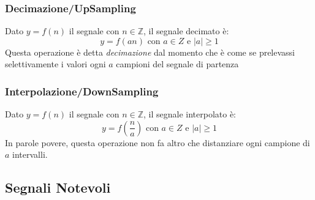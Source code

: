 \subsubsection{Decimazione/UpSampling}
Dato $y=f(n)$ il segnale con $n \in \mathbb{Z}$, il segnale decimato è:
\begin{equation}
    y = f(an) \mbox{ con } a \in Z \mbox{ e } |a| \geq 1 
\end{equation}
Questa operazione è detta \textit{decimazione} dal momento che è come se prelevassi selettivamente i valori ogni $a$ campioni del segnale di partenza

\subsubsection{Interpolazione/DownSampling}
Dato $y=f(n)$ il segnale con $n \in \mathbb{Z}$, il segnale interpolato è:
\begin{equation}
    y = f\left(\frac{n}{a}\right) \mbox{ con } a \in Z \mbox{ e } |a| \geq 1 
\end{equation}
In parole povere, questa operazione non fa altro che distanziare ogni campione di $a$ intervalli.

\newpage

\subsection{Segnali Notevoli}
